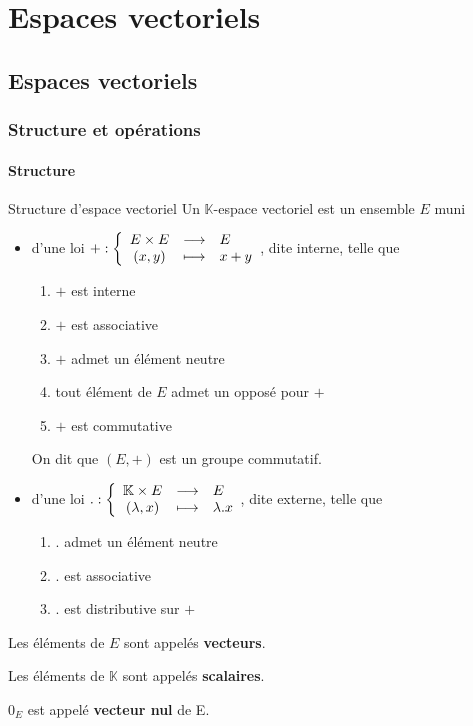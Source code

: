 \chapter{Espaces vectoriels}
\chaptertoc

\section{Espaces vectoriels}

\subsection{Structure et opérations}

    \subsubsection{Structure}

    \begin{defi}{Structure d’espace vectoriel}{}
        Un $\mathbb{K}$-espace vectoriel est un ensemble $E$ muni 
        \begin{itemize}
            \item d’une loi $\fonction{+}{E \times E}{E}{(x,y)}{x + y}$, dite interne, telle que \begin{enumerate}
                \item $+$ est interne
                \item $+$ est associative
                \item $+$ admet un élément neutre
                \item tout élément de $E$ admet un opposé pour $+$
                \item $+$ est commutative
            \end{enumerate}
            On dit que $(E,+)$ est un groupe commutatif.
            \item d’une loi $\fonction{.}{\mathbb{K} \times E}{E}{(\lambda,x)}{\lambda . x}$, dite externe, telle que \begin{enumerate}
                \item $.$ admet un élément neutre
                \item $.$ est associative
                \item $.$ est distributive sur $+$
            \end{enumerate}
        \end{itemize}
        Les éléments de $E$ sont appelés \textbf{vecteurs}. 
        
        Les éléments de $\mathbb{K}$ sont appelés \textbf{scalaires}. 
        
        $0_E$ est appelé \textbf{vecteur nul} de E.
    \end{defi}

